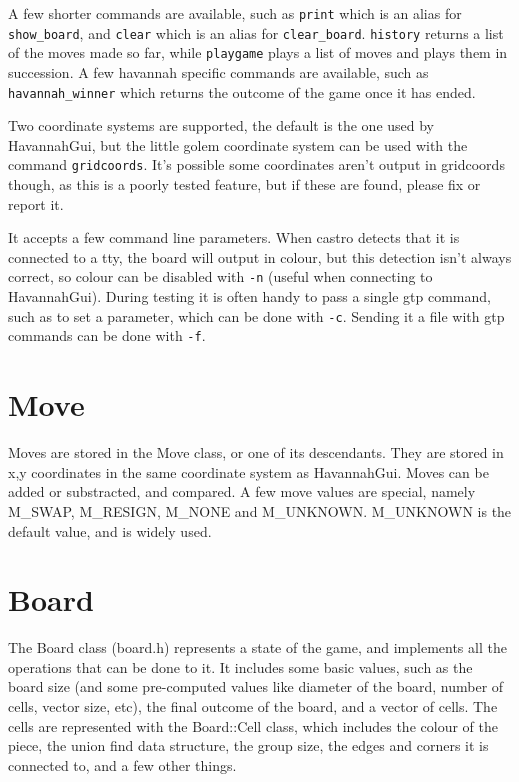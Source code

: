 \documentclass[12pt]{article}          %
\begin{document}
A few shorter commands are available, such as \texttt{print} which is an alias for \texttt{show\_board}, and \texttt{clear} which is an alias for \texttt{clear\_board}. \texttt{history} returns a list of the moves made so far, while \texttt{playgame} plays a list of moves and plays them in succession. A few havannah specific commands are available, such as \texttt{havannah\_winner} which returns the outcome of the game once it has ended.

Two coordinate systems are supported, the default is the one used by HavannahGui, but the little golem coordinate system can be used with the command \texttt{gridcoords}. It's possible some coordinates aren't output in gridcoords though, as this is a poorly tested feature, but if these are found, please fix or report it.

It accepts a few command line parameters. When castro detects that it is connected to a tty, the board will output in colour, but this detection isn't always correct, so colour can be disabled with \texttt{-n} (useful when connecting to HavannahGui). During testing it is often handy to pass a single gtp command, such as to set a parameter, which can be done with \texttt{-c}. Sending it a file with gtp commands can be done with \texttt{-f}.

\section{Move}

Moves are stored in the Move class, or one of its descendants. They are stored in x,y coordinates in the same coordinate system as HavannahGui. Moves can be added or substracted, and compared. A few move values are special, namely M\_SWAP, M\_RESIGN, M\_NONE and M\_UNKNOWN. M\_UNKNOWN is the default value, and is widely used.

\section{Board}

The Board class (board.h) represents a state of the game, and implements all the operations that can be done to it. It includes some basic values, such as the board size (and some pre-computed values like diameter of the board, number of cells, vector size, etc), the final outcome of the board, and a vector of cells. The cells are represented with the Board::Cell class, which includes the colour of the piece, the union find data structure, the group size, the edges and corners it is connected to, and a few other things.
\end{document}
